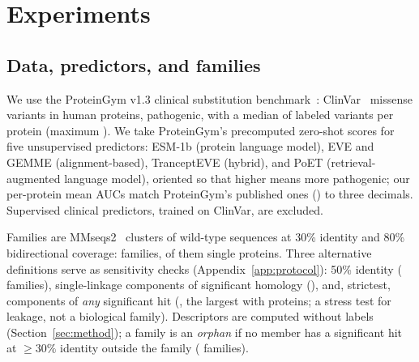 \section{Experiments}\label{sec:experiments}

\subsection{Data, predictors, and families}\label{sec:data}
We use the ProteinGym v1.3 clinical substitution benchmark~\cite{notin2023proteingym}: \nVariants{} ClinVar~\cite{landrum2018clinvar} missense variants in \nProteins{} human proteins, \fracPath{} pathogenic, with a median of \medVar{} labeled variants per protein (maximum \maxVar{}). We take ProteinGym's precomputed zero-shot scores for five unsupervised predictors: ESM-1b (protein language model), EVE and GEMME (alignment-based), TranceptEVE (hybrid), and PoET (retrieval-augmented language model), oriented so that higher means more pathogenic; our per-protein mean AUCs match ProteinGym's published ones (\pubAucRange{}) to three decimals. Supervised clinical predictors, trained on ClinVar, are excluded.

Families are MMseqs2~\cite{steinegger2017mmseqs2} clusters of wild-type sequences at 30\% identity and 80\% bidirectional coverage: \nFam{} families, \nFamSingleton{} of them single proteins. Three alternative definitions serve as sensitivity checks (Appendix~\ref{app:protocol}): 50\% identity (\nFamFifty{} families), single-linkage components of significant homology (\nFamHC{}), and, strictest, components of \emph{any} significant hit (\nFamRemote{}, the largest with \maxFamRemote{} proteins; a stress test for leakage, not a biological family). Descriptors are computed without labels (Section~\ref{sec:method}); a family is an \emph{orphan} if no member has a significant hit at $\ge30\%$ identity outside the family (\nFamOrphan{} families).

